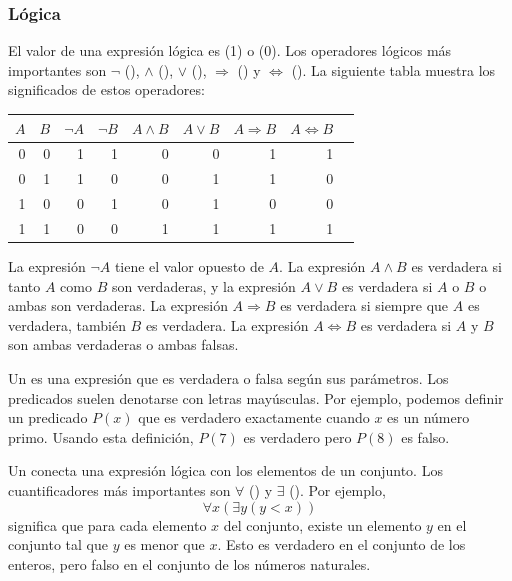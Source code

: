\subsubsection{Lógica}


El valor de una expresión lógica es
 (1) o  (0).
Los operadores lógicos más importantes son
$\lnot$ (),
$\land$ (),
$\lor$ (),
$\Rightarrow$ () y
$\Leftrightarrow$ ().
La siguiente tabla muestra los significados de estos operadores:

\begin{center}
\begin{tabular}{rr|rrrrrrr}
$A$ & $B$ & $\lnot A$ & $\lnot B$ & $A \land B$ & $A \lor B$ & $A \Rightarrow B$ & $A \Leftrightarrow B$ \\
\hline
0 & 0 & 1 & 1 & 0 & 0 & 1 & 1 \\
0 & 1 & 1 & 0 & 0 & 1 & 1 & 0 \\
1 & 0 & 0 & 1 & 0 & 1 & 0 & 0 \\
1 & 1 & 0 & 0 & 1 & 1 & 1 & 1 \\
\end{tabular}
\end{center}

La expresión $\lnot A$ tiene el valor opuesto de $A$.
La expresión $A \land B$ es verdadera si tanto $A$ como $B$
son verdaderas,
y la expresión $A \lor B$ es verdadera si $A$ o $B$ o ambas
son verdaderas.
La expresión $A \Rightarrow B$ es verdadera
si siempre que $A$ es verdadera, también $B$ es verdadera.
La expresión $A \Leftrightarrow B$ es verdadera
si $A$ y $B$ son ambas verdaderas o ambas falsas.


Un  es una expresión que es verdadera o falsa
según sus parámetros.
Los predicados suelen denotarse con letras mayúsculas.
Por ejemplo, podemos definir un predicado $P(x)$
que es verdadero exactamente cuando $x$ es un número primo.
Usando esta definición, $P(7)$ es verdadero pero $P(8)$ es falso.


Un  conecta una expresión lógica
con los elementos de un conjunto.
Los cuantificadores más importantes son
$\forall$ () y $\exists$ ().
Por ejemplo,
\[\forall x (\exists y (y < x))\]
significa que para cada elemento $x$ del conjunto,
existe un elemento $y$ en el conjunto
tal que $y$ es menor que $x$.
Esto es verdadero en el conjunto de los enteros,
pero falso en el conjunto de los números naturales.

